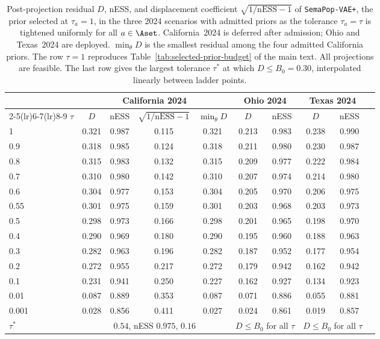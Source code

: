 \begin{table}[htbp]
\centering
\small
\caption{Post-projection residual \(D\), nESS, and displacement coefficient \(\sqrt{1/\mathrm{nESS}-1}\) of \texttt{SemaPop-VAE+}, the prior selected at \(\tau_a=1\), in the three 2024 scenarios with admitted priors as the tolerance \(\tau_a=\tau\) is tightened uniformly for all \(a\in\Aset\). California~2024 is deferred after admission; Ohio and Texas~2024 are deployed. \(\min_\theta D\) is the smallest residual among the four admitted California priors. The row \(\tau=1\) reproduces Table~\ref*{tab:selected-prior-budget} of the main text. All projections are feasible. The last row gives the largest tolerance \(\tau^{\ast}\) at which \(D\le B_0=0.30\), interpolated linearly between ladder points.}
\label{tab:tau-ladder}
\begin{tabular}{lccccccccc}
\toprule
 & \multicolumn{4}{c}{California 2024} & \multicolumn{2}{c}{Ohio 2024} & \multicolumn{2}{c}{Texas 2024} \\
\cmidrule(lr){2-5}\cmidrule(lr){6-7}\cmidrule(lr){8-9}
\(\tau\) & \(D\) & nESS & \(\sqrt{1/\mathrm{nESS}-1}\) & \(\min_\theta D\) & \(D\) & nESS & \(D\) & nESS \\
\midrule
1 & 0.321 & 0.987 & 0.115 & 0.321 & 0.213 & 0.983 & 0.238 & 0.990 \\
0.9 & 0.318 & 0.985 & 0.124 & 0.318 & 0.211 & 0.980 & 0.230 & 0.987 \\
0.8 & 0.315 & 0.983 & 0.132 & 0.315 & 0.209 & 0.977 & 0.222 & 0.984 \\
0.7 & 0.310 & 0.980 & 0.142 & 0.310 & 0.207 & 0.974 & 0.214 & 0.980 \\
0.6 & 0.304 & 0.977 & 0.153 & 0.304 & 0.205 & 0.970 & 0.206 & 0.975 \\
0.55 & 0.301 & 0.975 & 0.159 & 0.301 & 0.203 & 0.968 & 0.203 & 0.973 \\
0.5 & 0.298 & 0.973 & 0.166 & 0.298 & 0.201 & 0.965 & 0.198 & 0.970 \\
0.4 & 0.290 & 0.969 & 0.180 & 0.290 & 0.195 & 0.960 & 0.188 & 0.963 \\
0.3 & 0.282 & 0.963 & 0.196 & 0.282 & 0.187 & 0.952 & 0.177 & 0.954 \\
0.2 & 0.272 & 0.955 & 0.217 & 0.272 & 0.179 & 0.942 & 0.162 & 0.942 \\
0.1 & 0.231 & 0.941 & 0.250 & 0.227 & 0.162 & 0.927 & 0.134 & 0.923 \\
0.01 & 0.087 & 0.889 & 0.353 & 0.087 & 0.071 & 0.886 & 0.055 & 0.881 \\
0.001 & 0.028 & 0.856 & 0.411 & 0.027 & 0.024 & 0.861 & 0.019 & 0.857 \\
\midrule
\(\tau^{\ast}\) & \multicolumn{4}{c}{\(0.54\), nESS \(0.975\), \(0.16\)} & \multicolumn{2}{c}{\(D\le B_0\) for all \(\tau\)} & \multicolumn{2}{c}{\(D\le B_0\) for all \(\tau\)} \\
\bottomrule
\end{tabular}
\end{table}
